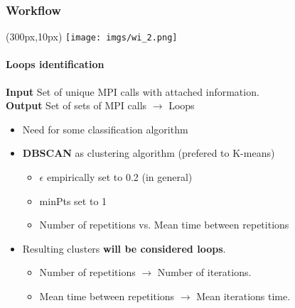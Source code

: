 \documentclass{beamer}
\begin{document}
\begin{frame}
\frametitle{Workflow}
\begin{textblock*}{5cm}(300px,10px) %
	\texttt{[image: imgs/wi\_2.png]}
\end{textblock*}
\framesubtitle{Loops identification}
\begin{mdframed}[backgroundcolor=blue!10,roundcorner=10pt,linewidth=0pt]
\textbf{Input} Set of unique MPI calls with attached information.\\
\textbf{Output} Set of sets of MPI calls $\rightarrow$ Loops
\end{mdframed}
\vfill
\pause

\begin{itemize}
	\item Need for some classification algorithm
	\pause
	\item \textbf{DBSCAN} as clustering algorithm (prefered to K-means)
	\begin{itemize}
		\item $\epsilon$ empirically set to 0.2 (in general)
		\item minPts set to 1
		\item Number of repetitions vs. Mean time between repetitions
	\end{itemize}
\pause
	\item Resulting clusters \textbf{will be considered loops}.
	\begin{itemize}
		\item Number of repetitions $\rightarrow$ Number of iterations.
		\item Mean time between repetitions $\rightarrow$ Mean iterations time.
	\end{itemize}
\end{itemize}
\end{frame}
\end{document}
